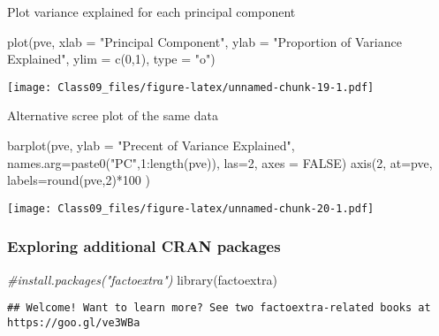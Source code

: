 \documentclass[
]{article}
\newenvironment{Shaded}{\begin{snugshade}}{\end{snugshade}}
\newcommand{\AttributeTok}[1]{\textcolor[rgb]{0.77,0.63,0.00}{#1}}
\newcommand{\CommentTok}[1]{\textcolor[rgb]{0.56,0.35,0.01}{\textit{#1}}}
\newcommand{\ConstantTok}[1]{\textcolor[rgb]{0.00,0.00,0.00}{#1}}
\newcommand{\DecValTok}[1]{\textcolor[rgb]{0.00,0.00,0.81}{#1}}
\newcommand{\FunctionTok}[1]{\textcolor[rgb]{0.00,0.00,0.00}{#1}}
\newcommand{\NormalTok}[1]{#1}
\newcommand{\SpecialCharTok}[1]{\textcolor[rgb]{0.00,0.00,0.00}{#1}}
\newcommand{\StringTok}[1]{\textcolor[rgb]{0.31,0.60,0.02}{#1}}
\begin{document}
Plot variance explained for each principal component

\begin{Shaded}
\begin{Highlighting}[]
\FunctionTok{plot}\NormalTok{(pve, }\AttributeTok{xlab =} \StringTok{"Principal Component"}\NormalTok{, }\AttributeTok{ylab =} \StringTok{"Proportion of Variance Explained"}\NormalTok{, }\AttributeTok{ylim =} \FunctionTok{c}\NormalTok{(}\DecValTok{0}\NormalTok{,}\DecValTok{1}\NormalTok{), }\AttributeTok{type =} \StringTok{"o"}\NormalTok{)}
\end{Highlighting}
\end{Shaded}

\texttt{[image: Class09\_files/figure-latex/unnamed-chunk-19-1.pdf]}

Alternative scree plot of the same data

\begin{Shaded}
\begin{Highlighting}[]
\FunctionTok{barplot}\NormalTok{(pve, }\AttributeTok{ylab =} \StringTok{"Precent of Variance Explained"}\NormalTok{, }\AttributeTok{names.arg=}\FunctionTok{paste0}\NormalTok{(}\StringTok{"PC"}\NormalTok{,}\DecValTok{1}\SpecialCharTok{:}\FunctionTok{length}\NormalTok{(pve)), }\AttributeTok{las=}\DecValTok{2}\NormalTok{, }\AttributeTok{axes =} \ConstantTok{FALSE}\NormalTok{)}
\FunctionTok{axis}\NormalTok{(}\DecValTok{2}\NormalTok{, }\AttributeTok{at=}\NormalTok{pve, }\AttributeTok{labels=}\FunctionTok{round}\NormalTok{(pve,}\DecValTok{2}\NormalTok{)}\SpecialCharTok{*}\DecValTok{100}\NormalTok{ )}
\end{Highlighting}
\end{Shaded}

\texttt{[image: Class09\_files/figure-latex/unnamed-chunk-20-1.pdf]}

\hypertarget{exploring-additional-cran-packages}{%
\subsubsection{Exploring additional CRAN
packages}\label{exploring-additional-cran-packages}}

\begin{Shaded}
\begin{Highlighting}[]
\CommentTok{\#install.packages("factoextra")}
\FunctionTok{library}\NormalTok{(factoextra)}
\end{Highlighting}
\end{Shaded}

\begin{verbatim}
## Welcome! Want to learn more? See two factoextra-related books at https://goo.gl/ve3WBa
\end{verbatim}
\end{document}
